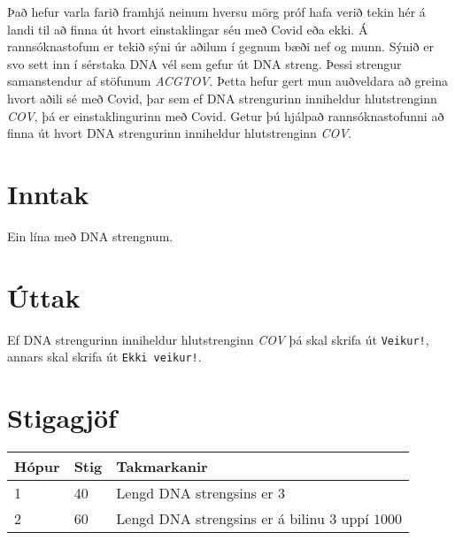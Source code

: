 %


Það hefur varla farið framhjá neinum hversu mörg próf hafa verið tekin hér á landi til að finna út hvort einstaklingar séu með Covid eða ekki.
Á rannsóknastofum er tekið sýni úr aðilum í gegnum bæði nef og munn. Sýnið er svo sett inn í sérstaka DNA vél sem
gefur út DNA streng. Þessi strengur samanstendur af stöfunum \textit{ACGTOV}. Þetta hefur gert mun auðveldara
að greina hvort aðili sé með Covid, þar sem ef DNA strengurinn inniheldur hlutstrenginn \textit{COV}, þá er einstaklingurinn með Covid. Getur þú hjálpað rannsóknastofunni að finna út hvort DNA strengurinn inniheldur hlutstrenginn \textit{COV}.

\section*{Inntak}
Ein lína með DNA strengnum.

\section*{Úttak}
Ef DNA strengurinn inniheldur hlutstrenginn \textit{COV} þá skal skrifa út
\texttt{Veikur!}, annars skal skrifa út \texttt{Ekki veikur!}.

\section*{Stigagjöf}
\begin{tabular}{|l|l|l|}
\hline
Hópur & Stig & Takmarkanir \\ \hline
1     & 40  & Lengd DNA strengsins er $3$ \\ \hline
2     & 60  & Lengd DNA strengsins er á bilinu $3$ uppí $1000$ \\ \hline
\end{tabular}

